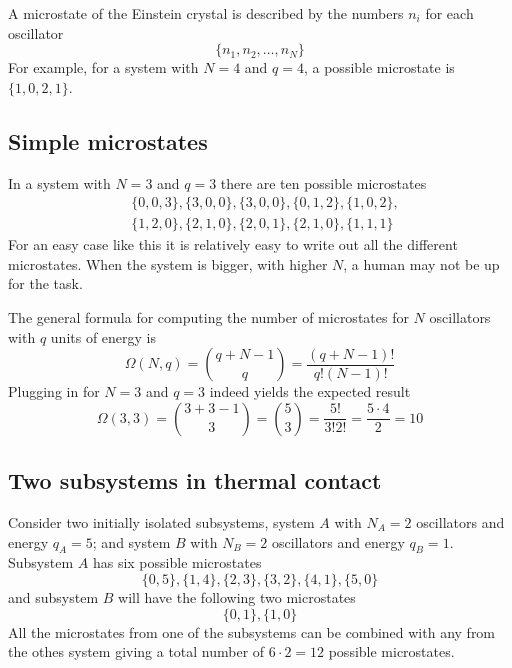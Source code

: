 \documentclass[10pt,a4paper]{amsart}
\begin{document}
A microstate of the Einstein crystal is described by the numbers $n_i$ for each oscillator
\begin{equation}
\{n_1,n_2,\dots,n_N\}
\end{equation}
For example, for a system with $N=4$ and $q=4$, a possible microstate is $\{1,0,2,1\}$.

\subsection{Simple microstates}
In a system with $N=3$ and $q=3$ there are ten possible microstates
\begin{align*}
&\{0,0,3\},\{3,0,0\},\{3,0,0\},\{0,1,2\},\{1,0,2\},\\
&\{1,2,0\},\{2,1,0\},\{2,0,1\},\{2,1,0\},\{1,1,1\}
\end{align*}
For an easy case like this it is relatively easy to write out all the different microstates. When the system is bigger, with higher $N$, a human may not be up for the task.

The general formula for computing the number of microstates for $N$ oscillators with $q$ units of energy is
\begin{equation}
\label{eq:binom}
\Omega(N,q)=\binom{q+N-1}{q}=\frac{(q+N-1)!}{q!(N-1)!}
\end{equation} 
Plugging in for $N=3$ and $q=3$ indeed yields the expected result
\begin{equation*}
\Omega(3,3)=\binom{3+3-1}{3}=\binom{5}{3}=\frac{5!}{3!2!}=\frac{5\cdot4}{2}=10
\end{equation*}

\subsection{Two subsystems in thermal contact}
Consider two initially isolated subsystems, system $A$ with $N_A=2$ oscillators and energy $q_A=5$; and system $B$ with $N_B=2$ oscillators and energy $q_B=1$. Subsystem $A$ has six possible microstates 
\begin{equation*}
\{0,5\},\{1,4\},\{2,3\},\{3,2\},\{4,1\},\{5,0\}
\end{equation*} 
and subsystem $B$ will have the following two microstates
\begin{equation*}
\{0,1\},\{1,0\}
\end{equation*}
All the microstates from one of the subsystems can be combined with any from the othes system giving a total number of $6\cdot2=12$ possible microstates.
\end{document}
